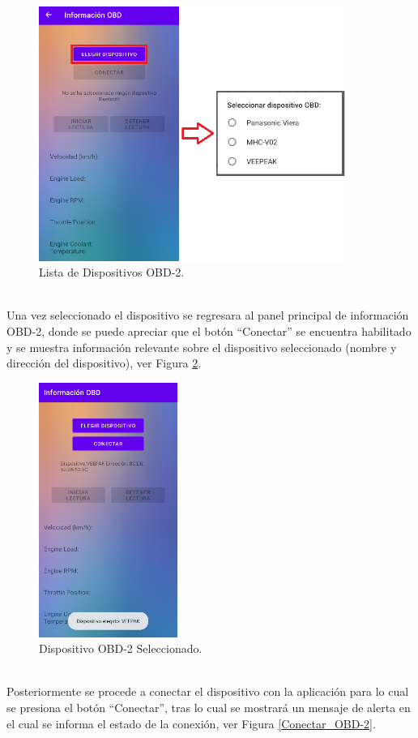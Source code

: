 \documentclass[a4paper,10pt, oneside, titlepage]{article}
\begin{document}
	\begin{figure}[!h]
		\centering
		\includegraphics[width = 0.7\linewidth, height = 8.3cm]{Lista_Dispositivos_OBD2.png}
		\caption{Lista de Dispositivos OBD-2.}
		\label{Lista_Dispositivos_OBD2}
	\end{figure} \\
	\indent Una vez seleccionado el dispositivo se regresara al panel principal de información OBD-2, donde se puede apreciar que el botón ``Conectar'' se encuentra habilitado y se muestra información relevante sobre el dispositivo seleccionado (nombre y dirección del dispositivo), ver Figura \ref{Dispositivo_OBD2_Seleccionado}.
	\begin{figure}[!h]
		\centering
		\includegraphics[width = 0.45\linewidth, height = 8.3cm]{Dispositivo_OBD2_Seleccionado.png}
		\caption{Dispositivo OBD-2 Seleccionado.}
		\label{Dispositivo_OBD2_Seleccionado}
	\end{figure} \\
	\indent Posteriormente se procede a conectar el dispositivo con la aplicación para lo cual se presiona el botón ``Conectar'', tras lo cual se mostrará un mensaje de alerta en el cual se informa el estado de la conexión, ver Figura \ref{Conectar_OBD-2}.
\end{document}
